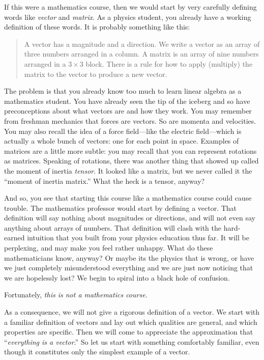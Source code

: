 \documentclass[12pt]{article}
\begin{document}
If this were a mathematics course, then we would start by very carefully defining words like \emph{vector} and \emph{matrix}. As a physics student, you already have a working definition of these words. It is probably something like this:
%
\begin{quote}
A vector has a magnitude and a direction. We write a vector as an array of three numbers arranged in a column. A matrix is an array of nine numbers arranged in a $3\times 3$ block. There is a rule for how to apply (multiply) the matrix to the vector to produce a new vector.
\end{quote}

The problem is that you already know too much to learn linear algebra as a mathematics student. You have already seen the tip of the iceberg and so have preconceptions about what vectors are and how they work. You may remember from freshman mechanics that forces are vectors. So are momenta and velocities. You may also recall the idea of a force field---like the electric field---which is actually a whole bunch of vectors: one for each point in space. Examples of matrices are a little more subtle: you may recall that you can represent rotations as matrices. Speaking of rotations, there was another thing that showed up called the moment of inertia \emph{tensor}. It looked like a matrix, but we never called it the ``moment of inertia matrix.'' What the heck is a tensor, anyway?

And so, you see that starting this course like a mathematics course could cause trouble. The mathematics professor would start by defining a vector. That definition will say nothing about magnitudes or directions, and will not even say anything about arrays of numbers. That definition will clash with the hard-earned intuition that you built from your physics education thus far. It will be perplexing, and may make you feel rather unhappy. What do these mathematicians know, anyway? Or maybe its the physics that is wrong, or have we just completely misunderstood everything and we are just now noticing that we are hopelessly lost? We begin to spiral into a black hole of confusion.

\begin{framed}
Fortunately, \emph{this is not a mathematics course.}
\end{framed}

As a consequence, we will not give a rigorous definition of a vector. We start with a familiar definition of vectors and lay out which qualities are general, and which properties are specific. Then we will come to appreciate the approximation that ``\emph{everything is a vector}.'' So let us start with something comfortably familiar, even though it constitutes only the simplest example of a vector.
\end{document}
